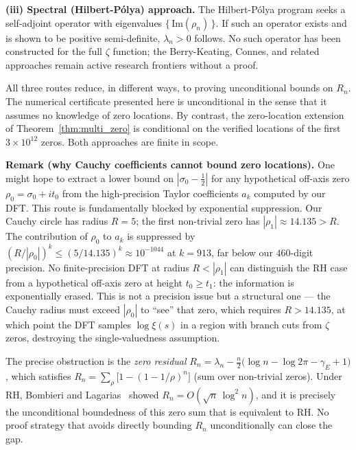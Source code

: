 \documentclass[11pt]{article}
\begin{document}
\textbf{(iii) Spectral (Hilbert-Pólya) approach.}
The Hilbert-Pólya program seeks a self-adjoint operator with eigenvalues
$\{\,\mathrm{Im}(\rho_n)\,\}$. If such an operator exists and is shown to be
positive semi-definite, $\lambda_n > 0$ follows. No such operator has been constructed
for the full $\zeta$ function; the Berry-Keating, Connes, and related approaches
remain active research frontiers without a proof.

\noindent
All three routes reduce, in different ways, to proving unconditional bounds on $R_n$.
The numerical certificate presented here is unconditional in the sense that it assumes
no knowledge of zero locations. By contrast, the zero-location extension of
Theorem~\ref{thm:multi_zero} is conditional on the verified locations of the first
$3\times10^{12}$ zeros. Both approaches are finite in scope.

\textbf{Remark (why Cauchy coefficients cannot bound zero locations).}
One might hope to extract a lower bound on $|\sigma_0 - \tfrac{1}{2}|$ for any
hypothetical off-axis zero $\rho_0 = \sigma_0 + it_0$ from the high-precision
Taylor coefficients $a_k$ computed by our DFT. This route is fundamentally blocked
by exponential suppression. Our Cauchy circle has radius $R = 5$; the first
non-trivial zero has $|\rho_1| \approx 14.135 > R$. The contribution of $\rho_0$
to $a_k$ is suppressed by $(R/|\rho_0|)^k \le (5/14.135)^k \approx 10^{-1044}$
at $k = 913$, far below our $460$-digit precision. No finite-precision DFT at
radius $R < |\rho_1|$ can distinguish the RH case from a hypothetical off-axis
zero at height $t_0 \ge t_1$: the information is exponentially erased.
This is not a precision issue but a structural one --- the Cauchy radius must
exceed $|\rho_0|$ to ``see'' that zero, which requires $R > 14.135$, at which
point the DFT samples $\log\xi(s)$ in a region with branch cuts from
$\zeta$ zeros, destroying the single-valuedness assumption.

The precise obstruction is the \emph{zero residual}
$R_n = \lambda_n - \frac{n}{2}\bigl(\log n - \log 2\pi - \gamma_E + 1\bigr)$,
which satisfies $R_n = \sum_\rho \bigl[1 - (1-1/\rho)^n\bigr]$ (sum over non-trivial zeros).
Under RH, Bombieri and Lagarias~\cite{bombieri1999} showed $R_n = O(\sqrt{n}\,\log^2 n)$,
and it is precisely the unconditional boundedness of this zero sum that is equivalent to RH.
No proof strategy that avoids directly bounding $R_n$ unconditionally can close the gap.
\end{document}

